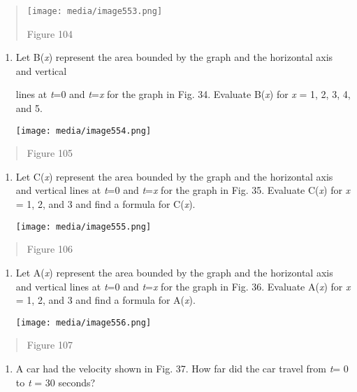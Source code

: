 \begin{quote}
\texttt{[image: media/image553.png]}

Figure 104
\end{quote}

\begin{enumerate}
\def\labelenumi{\arabic{enumi}.}
\item
  Let B(\emph{x}) represent the area bounded by the graph and the
  horizontal axis and vertical

  lines at \emph{t}=0 and \emph{t}=\emph{x} for the graph in Fig. 34.
  Evaluate B(\emph{x}) for \emph{x} = 1, 2, 3, 4, and 5.

  \texttt{[image: media/image554.png]}
\end{enumerate}

\begin{quote}
Figure 105
\end{quote}

\begin{enumerate}
\def\labelenumi{\arabic{enumi}.}
\item
  Let C(\emph{x}) represent the area bounded by the graph and the
  horizontal axis and vertical lines at \emph{t}=0 and \emph{t}=\emph{x}
  for the graph in Fig. 35. Evaluate C(\emph{x}) for \emph{x} = 1, 2,
  and 3 and find a formula for C(\emph{x}).

  \texttt{[image: media/image555.png]}
\end{enumerate}

\begin{quote}
Figure 106
\end{quote}

\begin{enumerate}
\def\labelenumi{\arabic{enumi}.}
\item
  Let A(\emph{x}) represent the area bounded by the graph and the
  horizontal axis and vertical lines at \emph{t}=0 and \emph{t}=\emph{x}
  for the graph in Fig. 36. Evaluate A(\emph{x}) for \emph{x} = 1, 2,
  and 3 and find a formula for A(\emph{x}).

  \texttt{[image: media/image556.png]}
\end{enumerate}

\begin{quote}
Figure 107
\end{quote}

\begin{enumerate}
\def\labelenumi{\arabic{enumi}.}
\item
  A car had the velocity shown in Fig. 37. How far did the car travel
  from \emph{t}= 0 to \emph{t} = 30 seconds?
\end{enumerate}

